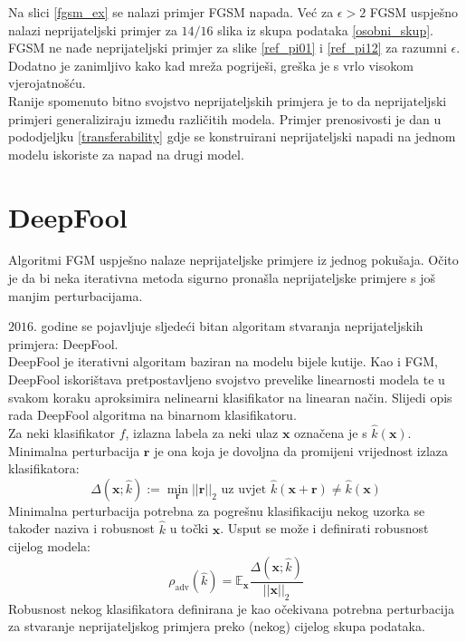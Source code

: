 \documentclass[utf8, diplomski]{fer}
\begin{document}
Na slici \ref{fgsm_ex} se nalazi primjer FGSM napada. Već za $\epsilon > 2$ FGSM uspješno nalazi neprijateljski primjer za $14/16$ slika iz skupa podataka \ref{osobni_skup}. FGSM ne nađe neprijateljski primjer za slike \ref{ref_pi01} i \ref{ref_pi12} za razumni $\epsilon$. Dodatno je zanimljivo kako kad mreža pogriješi, greška je s vrlo visokom vjerojatnošću. \\
Ranije spomenuto bitno svojstvo neprijateljskih primjera je to da neprijateljski primjeri generaliziraju između različitih modela. Primjer prenosivosti je dan u pododjeljku \ref{transferability} gdje se konstruirani neprijateljski napadi na jednom modelu iskoriste za napad na drugi model.
\section{DeepFool}
Algoritmi FGM uspješno nalaze neprijateljske primjere iz jednog pokušaja. Očito je da bi neka iterativna metoda sigurno pronašla neprijateljske primjere s još manjim perturbacijama.
\par
$2016.$ godine se pojavljuje sljedeći bitan algoritam stvaranja neprijateljskih primjera: DeepFool.\\
DeepFool je iterativni algoritam baziran na modelu bijele kutije. Kao i FGM, DeepFool iskorištava pretpostavljeno svojstvo prevelike linearnosti modela te u svakom koraku aproksimira nelinearni klasifikator na linearan način. Slijedi opis rada DeepFool algoritma na binarnom klasifikatoru. \\
Za neki klasifikator $f$, izlazna labela za neki ulaz $\boldsymbol{x}$ označena je s $\hat{k}(\boldsymbol{x})$. Minimalna perturbacija $\boldsymbol{r}$ je ona koja je dovoljna da promijeni vrijednost izlaza klasifikatora:
\begin{equation}
	\Delta (\boldsymbol{x}; \hat{k}) := \mathop{\min}_{\boldsymbol{r}} ||\boldsymbol{r}||_{2} \text{ uz uvjet } \hat{k}(\boldsymbol{x}+\boldsymbol{r}) \neq \hat{k}(\boldsymbol{x})
\end{equation}
Minimalna perturbacija potrebna za pogrešnu klasifikaciju nekog uzorka se također naziva i robusnost $\hat{k}$ u točki $\boldsymbol{x}$. Usput se može i definirati robusnost cijelog modela:
\begin{equation}
	\rho_{\text{adv}}(\hat{k}) = \mathbb{E}_{\boldsymbol{x}} \frac{\Delta (\boldsymbol{x}; \hat{k})}{||\boldsymbol{x}||_{2}}
\end{equation}
Robusnost nekog klasifikatora definirana je kao očekivana potrebna perturbacija za stvaranje neprijateljskog primjera preko (nekog) cijelog skupa podataka. \\
\end{document}
